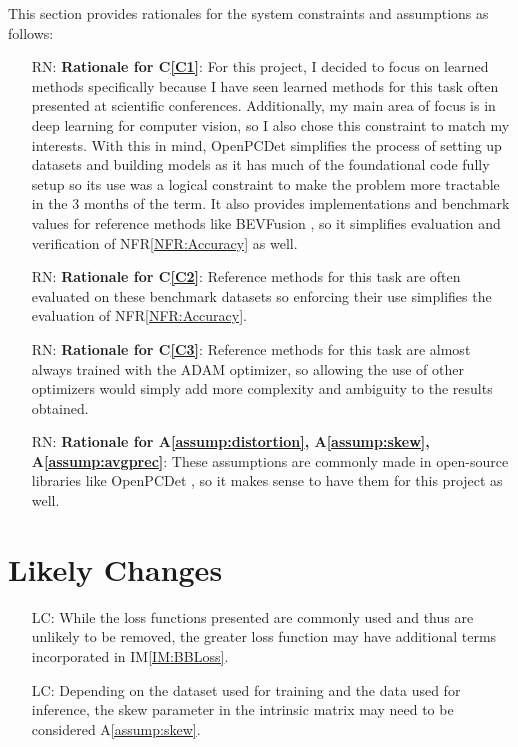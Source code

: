 \documentclass[12pt]{article}
\newcommand{\aref}[1]{A\ref{#1}}
\newcommand{\iref}[1]{IM\ref{#1}}
\newcommand{\cref}[1]{C\ref{#1}}
\newcommand{\nfrref}[1]{NFR\ref{#1}}
\newcounter{lcnum} %
\newcounter{rnnum} %
\begin{document}
This section provides rationales for the system constraints and assumptions as follows:
\begin{itemize}
  \item[RN\refstepcounter{rnnum}\thernnum\label{RN:Learn}:] \textbf{Rationale for \cref{C1}}: For this project, I decided to focus on learned methods specifically because I have seen learned methods for this task often presented at scientific conferences. 
  Additionally, my main area of focus is in deep learning for computer vision, so I also chose this constraint to match my interests. With this in mind, OpenPCDet \cite{openpcdet2020} simplifies the process of setting up datasets and 
  building models as it has much of the foundational code fully setup so its use was a logical constraint to make the problem more tractable in the 3 months of the term. It also provides implementations and benchmark
  values for reference methods like BEVFusion \cite{liang2022bevfusion}, so it simplifies evaluation and verification of \nfrref{NFR:Accuracy} as well.
  \item[RN\refstepcounter{rnnum}\thernnum\label{RN:Dataset}:] \textbf{Rationale for \cref{C2}}: Reference methods for this task are often evaluated on these benchmark datasets so enforcing their use simplifies the evaluation of \nfrref{NFR:Accuracy}.
  \item[RN\refstepcounter{rnnum}\thernnum\label{RN:Optim}:] \textbf{Rationale for \cref{C3}}: Reference methods for this task are almost always trained with the ADAM optimizer, so allowing the use of other optimizers would simply add more complexity and ambiguity to the results obtained.
  \item[RN\refstepcounter{rnnum}\thernnum\label{RN:Assump}:] \textbf{Rationale for \aref{assump:distortion}, \aref{assump:skew}, \aref{assump:avgprec}}: These assumptions are commonly made in open-source libraries like OpenPCDet \cite{openpcdet2020}, so it makes sense to have them for this project as well.
\end{itemize}

\section{Likely Changes}    

\noindent \begin{itemize}
\item[LC\refstepcounter{lcnum}\thelcnum\label{LC:Loss}:] While the loss functions presented are commonly used and thus are unlikely to be removed, the greater loss function may have additional terms incorporated in \iref{IM:BBLoss}.
\item[LC\refstepcounter{lcnum}\thelcnum\label{LC:Skew}:] Depending on the dataset used for training and the data used for inference, the skew parameter in the intrinsic matrix may need to be considered \aref{assump:skew}.
\end{itemize}
\end{document}
